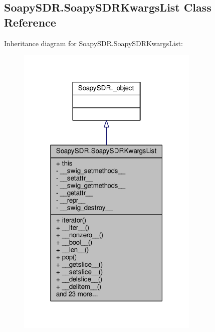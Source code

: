 \subsection{Soapy\+S\+D\+R.\+Soapy\+S\+D\+R\+Kwargs\+List Class Reference}
\label{classSoapySDR_1_1SoapySDRKwargsList}


Inheritance diagram for Soapy\+S\+D\+R.\+Soapy\+S\+D\+R\+Kwargs\+List\+:
\nopagebreak
\begin{figure}[H]
\begin{center}
\leavevmode
\includegraphics[width=247pt]{de/d2b/classSoapySDR_1_1SoapySDRKwargsList__inherit__graph}
\end{center}
\end{figure}



